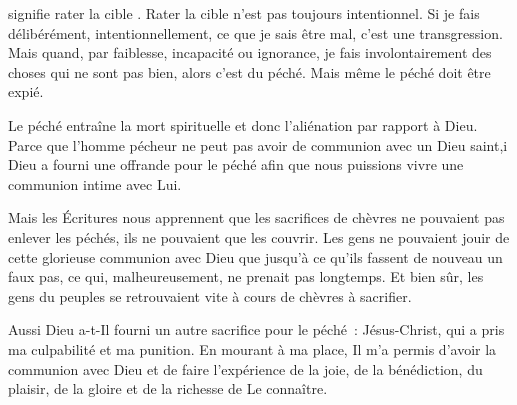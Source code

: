 


 signifie \og rater la cible \fg{}.
 Rater la cible n'est pas toujours intentionnel.
 Si je fais délibérément, intentionnellement, ce que je sais être mal,
 c'est une transgression. Mais quand, par faiblesse, incapacité ou ignorance,
 je fais involontairement des choses qui ne sont pas bien, alors c'est du péché.
 Mais même le péché doit être expié.


Le péché entraîne la mort spirituelle et donc l'aliénation par rapport à Dieu.
 Parce que l'homme pécheur ne peut pas avoir de communion avec un Dieu saint,i
 Dieu a fourni une offrande pour le péché afin que nous puissions vivre
 une communion intime avec Lui.

Mais les Écritures nous apprennent que les sacrifices de chèvres
 ne pouvaient pas enlever les péchés, ils ne pouvaient que les couvrir.
 Les gens ne pouvaient jouir de cette glorieuse communion avec Dieu
 que jusqu'à ce qu'ils fassent de nouveau un faux pas, ce qui, malheureusement,
 ne prenait pas longtemps.
 Et bien sûr, les gens du peuples se retrouvaient vite
 à cours de chèvres à sacrifier.

Aussi Dieu a-t-Il fourni un autre sacrifice pour le péché~: Jésus-Christ,
 qui a pris ma culpabilité et ma punition.
 En mourant à ma place, Il m'a permis d'avoir la communion avec Dieu
 et de faire l'expérience de la joie, de la bénédiction, du plaisir,
 de la gloire et de la richesse de Le connaître. 

\dvrule





